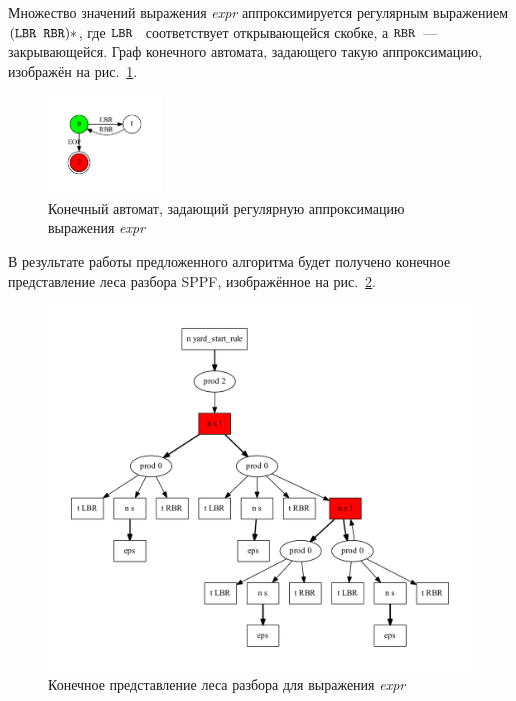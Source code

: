 Множество значений выражения \emph{expr} аппроксимируется регулярным выражением $(\mbox{\texttt{LBR }} \mbox{\texttt{RBR}})*$, где $\mbox{\texttt{LBR }}$ соответствует открывающейся скобке, а $\mbox{\texttt{RBR}}$~--- закрывающейся. Граф конечного автомата, задающего такую аппроксимацию, изображён на рис.~\ref{input}.
\begin{figure}[!h]
 \centering
 \includegraphics[width=3cm]{Verbitskaya/pics/input.pdf}
 \caption{Конечный автомат, задающий регулярную аппроксимацию выражения \emph{expr}}
 \label{input}
\end{figure}

В результате работы предложенного алгоритма будет получено конечное представление леса разбора SPPF, изображённое на рис.~\ref{sppf}.
\begin{figure}[!h]
 \centering
 \includegraphics[width=\textwidth]{Verbitskaya/pics/sppf.pdf}
 \caption{Конечное представление леса разбора для выражения \emph{expr}}
 \label{sppf}
\end{figure}

